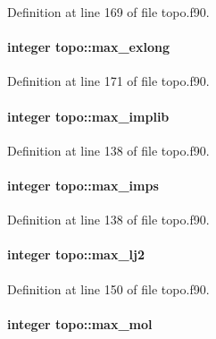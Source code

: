 Definition at line 169 of file topo.\-f90.

\hypertarget{classtopo_ae9731d005feffe66fba90dbd3d247ec9}{
\paragraph[{max\-\_\-exlong}]{\setlength{\rightskip}{0pt plus 5cm}integer topo\-::max\-\_\-exlong}}\label{classtopo_ae9731d005feffe66fba90dbd3d247ec9}


Definition at line 171 of file topo.\-f90.

\hypertarget{classtopo_a13e46089a183300ca9545d432d1b069a}{
\paragraph[{max\-\_\-implib}]{\setlength{\rightskip}{0pt plus 5cm}integer topo\-::max\-\_\-implib}}\label{classtopo_a13e46089a183300ca9545d432d1b069a}


Definition at line 138 of file topo.\-f90.

\hypertarget{classtopo_a1b4325f0531a3b008f1ce6b7e30aa825}{
\paragraph[{max\-\_\-imps}]{\setlength{\rightskip}{0pt plus 5cm}integer topo\-::max\-\_\-imps}}\label{classtopo_a1b4325f0531a3b008f1ce6b7e30aa825}


Definition at line 138 of file topo.\-f90.

\hypertarget{classtopo_afa9d4e5525b6c87435e9203dbedd00e9}{
\paragraph[{max\-\_\-lj2}]{\setlength{\rightskip}{0pt plus 5cm}integer topo\-::max\-\_\-lj2}}\label{classtopo_afa9d4e5525b6c87435e9203dbedd00e9}


Definition at line 150 of file topo.\-f90.

\hypertarget{classtopo_ab8596238bb7a672ce61644d634f46202}{
\paragraph[{max\-\_\-mol}]{\setlength{\rightskip}{0pt plus 5cm}integer topo\-::max\-\_\-mol}}\label{classtopo_ab8596238bb7a672ce61644d634f46202}


